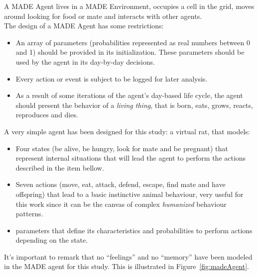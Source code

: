\documentclass{sig-alternate}
\begin{document}

A MADE Agent lives in a MADE Environment, occupies a cell in the grid, moves around looking for food or mate and interacts with other agents.\\

The design of a MADE Agent has some restrictions:
\begin{itemize}
\item An array of parameters (probabilities represented as real numbers between 0 and 1) should be provided in its initialization. These parameters should be used by the agent in its day-by-day decisions.
\item Every action or event is subject to be logged for later analysis.
\item As a result of some iterations of the agent's day-based life cycle, the agent should present the behavior of a \textit{living thing}, that is born, eats, grows, reacts, reproduces and dies.  
\end{itemize}

A very simple agent has been designed for this study: a virtual
rat, that models:
\begin{itemize}
\item Four states (be alive, be hungry, look for
mate and be pregnant) that represent internal situations that will lead the
agent to perform the actions described in the item bellow. %
\item Seven actions (move, eat, attack, defend, escape,
find mate and have offspring) that lead to a basic instinctive animal
behaviour, very useful for this work since it can be the canvas of 
complex \textit{humanized} behaviour patterns.
\item parameters that define its characteristics and probabilities to
perform actions depending on the state.
\end{itemize}
It's important to remark that no ``feelings'' and no ``memory''
have been modeled in the MADE agent for this study. This is
illustrated in Figure~\ref{fig:madeAgent}.
\end{document}
